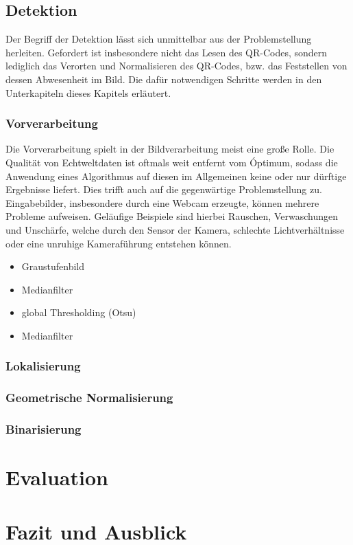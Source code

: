 \documentclass[a4paper, oneside, 12pt]{article}
\begin{document}
\subsection{Detektion}
\label{s:detektion}

Der Begriff der Detektion lässt sich unmittelbar aus der Problemstellung herleiten.
Gefordert ist insbesondere nicht das Lesen des QR-Codes, sondern lediglich das Verorten und Normalisieren des QR-Codes, bzw. das Feststellen von dessen Abwesenheit im Bild. Die dafür notwendigen Schritte werden in den Unterkapiteln dieses Kapitels erläutert.

\subsubsection{Vorverarbeitung}
Die Vorverarbeitung spielt in der Bildverarbeitung meist eine große Rolle. Die Qualität von Echtweltdaten ist oftmals weit entfernt vom Óptimum, sodass die Anwendung eines Algorithmus auf diesen im Allgemeinen keine oder nur dürftige Ergebnisse liefert.
Dies trifft auch auf die gegenwärtige Problemstellung zu. Eingabebilder, insbesondere durch eine Webcam erzeugte, können mehrere Probleme aufweisen.
Geläufige Beispiele sind hierbei Rauschen, Verwaschungen und Unschärfe, welche durch den Sensor der Kamera, schlechte Lichtverhältnisse oder eine unruhige Kameraführung entstehen können.

\begin{itemize}
	\item Graustufenbild
	\item Medianfilter
	\item global Thresholding (Otsu)
	\item Medianfilter
\end{itemize}

\subsubsection{Lokalisierung}

\subsubsection{Geometrische Normalisierung}

\subsubsection{Binarisierung}

\section{Evaluation}

\section{Fazit und Ausblick}
	
\end{document}
